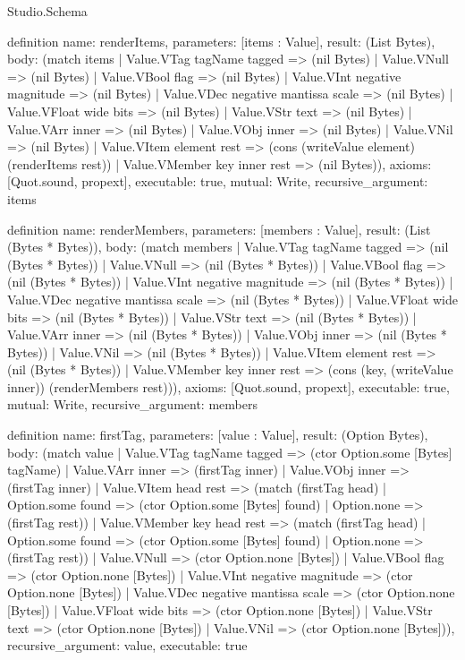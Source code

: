 \begin{lexlean}{Studio.Schema}
\begin{semanticmodule}
definition{
  name: renderItems,
  parameters: [items : Value],
  result: (List Bytes),
  body: (match items
    | Value.VTag tagName tagged => (nil Bytes)
    | Value.VNull => (nil Bytes)
    | Value.VBool flag => (nil Bytes)
    | Value.VInt negative magnitude => (nil Bytes)
    | Value.VDec negative mantissa scale => (nil Bytes)
    | Value.VFloat wide bits => (nil Bytes)
    | Value.VStr text => (nil Bytes)
    | Value.VArr inner => (nil Bytes)
    | Value.VObj inner => (nil Bytes)
    | Value.VNil => (nil Bytes)
    | Value.VItem element rest => (cons (writeValue element) (renderItems rest))
    | Value.VMember key inner rest => (nil Bytes)),
  axioms: [Quot.sound, propext],
  executable: true,
  mutual: Write,
  recursive_argument: items
}

definition{
  name: renderMembers,
  parameters: [members : Value],
  result: (List (Bytes * Bytes)),
  body: (match members
    | Value.VTag tagName tagged => (nil (Bytes * Bytes))
    | Value.VNull => (nil (Bytes * Bytes))
    | Value.VBool flag => (nil (Bytes * Bytes))
    | Value.VInt negative magnitude => (nil (Bytes * Bytes))
    | Value.VDec negative mantissa scale => (nil (Bytes * Bytes))
    | Value.VFloat wide bits => (nil (Bytes * Bytes))
    | Value.VStr text => (nil (Bytes * Bytes))
    | Value.VArr inner => (nil (Bytes * Bytes))
    | Value.VObj inner => (nil (Bytes * Bytes))
    | Value.VNil => (nil (Bytes * Bytes))
    | Value.VItem element rest => (nil (Bytes * Bytes))
    | Value.VMember key inner rest => (cons (key, (writeValue inner)) (renderMembers rest))),
  axioms: [Quot.sound, propext],
  executable: true,
  mutual: Write,
  recursive_argument: members
}

definition{
  name: firstTag,
  parameters: [value : Value],
  result: (Option Bytes),
  body: (match value
    | Value.VTag tagName tagged => (ctor Option.some [Bytes] tagName)
    | Value.VArr inner => (firstTag inner)
    | Value.VObj inner => (firstTag inner)
    | Value.VItem head rest => (match (firstTag head)
      | Option.some found => (ctor Option.some [Bytes] found)
      | Option.none => (firstTag rest))
    | Value.VMember key head rest => (match (firstTag head)
      | Option.some found => (ctor Option.some [Bytes] found)
      | Option.none => (firstTag rest))
    | Value.VNull => (ctor Option.none [Bytes])
    | Value.VBool flag => (ctor Option.none [Bytes])
    | Value.VInt negative magnitude => (ctor Option.none [Bytes])
    | Value.VDec negative mantissa scale => (ctor Option.none [Bytes])
    | Value.VFloat wide bits => (ctor Option.none [Bytes])
    | Value.VStr text => (ctor Option.none [Bytes])
    | Value.VNil => (ctor Option.none [Bytes])),
  recursive_argument: value,
  executable: true
}


\end{semanticmodule}
\end{lexlean}
